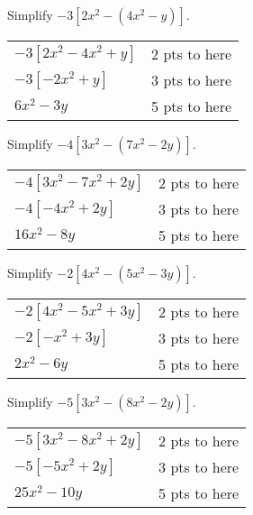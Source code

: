 {
	Simplify $-3[2x^2-(4x^2-y)]$.
}
{
	\begin{tabular}{lr}
	$-3[2x^2-4x^2+y]$ & 2 pts to here \\
	$-3[-2x^2+y]$ & 3 pts to here\\
	$6x^2-3y$ & 5 pts to here
	\end{tabular}
}

{
	Simplify $-4[3x^2-(7x^2-2y)]$.
}
{
	\begin{tabular}{lr}
	$-4[3x^2-7x^2+2y]$ & 2 pts to here \\
	$-4[-4x^2+2y]$ & 3 pts to here\\
	$16x^2-8y$ & 5 pts to here
	\end{tabular}
}

{
	Simplify $-2[4x^2-(5x^2-3y)]$.
}
{
	\begin{tabular}{lr}
	$-2[4x^2-5x^2+3y]$ & 2 pts to here \\
	$-2[-x^2+3y]$ & 3 pts to here\\
	$2x^2-6y$ & 5 pts to here
	\end{tabular}
}

{
	Simplify $-5[3x^2-(8x^2-2y)]$.
}
{
	\begin{tabular}{lr}
	$-5[3x^2-8x^2+2y]$ & 2 pts to here \\
	$-5[-5x^2+2y]$ & 3 pts to here\\
	$25x^2-10y$ & 5 pts to here
	\end{tabular}
}